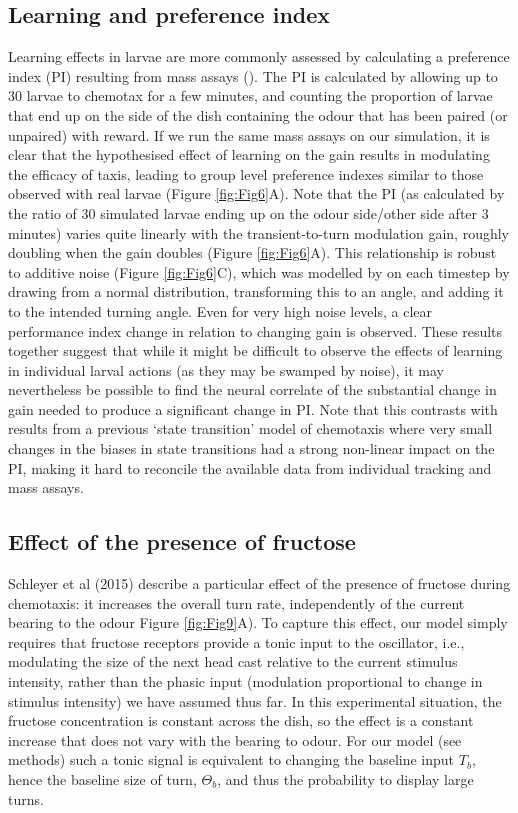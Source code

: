 \documentclass[10pt,a4paper]{article}
\begin{document}
\subsection{Learning and preference index}
Learning effects in larvae are more commonly assessed by calculating a preference index (PI) resulting from mass assays (\citep{gerber2009smelling}). The PI is calculated by allowing up to 30 larvae to chemotax for a few minutes, and counting the proportion of larvae that end up on the side of the dish containing the odour that has been paired (or unpaired) with reward. If we run the same mass assays on our simulation, it is clear that the hypothesised effect of learning on the gain results in modulating the efficacy of taxis, leading to group level preference indexes similar to those observed with real larvae (Figure \ref{fig:Fig6}A). Note that the PI (as calculated by the ratio of 30 simulated larvae ending up on the odour side/other side after 3 minutes) varies quite linearly with the transient-to-turn modulation gain, roughly doubling when the gain doubles (Figure \ref{fig:Fig6}A). This relationship is robust to additive noise (Figure \ref{fig:Fig6}C), which was modelled by on each timestep by drawing from a normal distribution, transforming this to an angle, and adding it to the intended turning angle. Even for very high noise levels, a clear performance index change in relation to changing gain is observed. These results together suggest that while it might be difficult to observe the effects of learning in individual larval actions (as they may be swamped by noise), it may nevertheless be possible to find the neural correlate of the substantial change in gain needed to produce a significant change in PI.
Note that this contrasts with results from a previous `state transition' model of chemotaxis \citep{davies2015model} where very small changes in the biases in state transitions had a strong non-linear impact on the PI, making it hard to reconcile the available data from individual tracking and mass assays.

\subsection{Effect of the presence of fructose}
Schleyer et al (2015) describe a particular effect of the presence of fructose during chemotaxis: it increases the overall turn rate, independently of the current bearing to the odour Figure \ref{fig:Fig9}A). To capture this effect, our model simply requires that fructose receptors provide a tonic input to the oscillator, i.e., modulating the size of the next head cast relative to the current stimulus intensity, rather than the phasic input (modulation proportional to change in stimulus intensity) we have assumed thus far. In this experimental situation, the fructose concentration is constant across the dish, so the effect is a constant increase that does not vary with the bearing to odour. For our model (see methods) such a tonic signal is equivalent to changing the baseline input $T_b$, hence the baseline size of turn, $\Theta_b$, and thus the probability to display large turns. 
\end{document}
